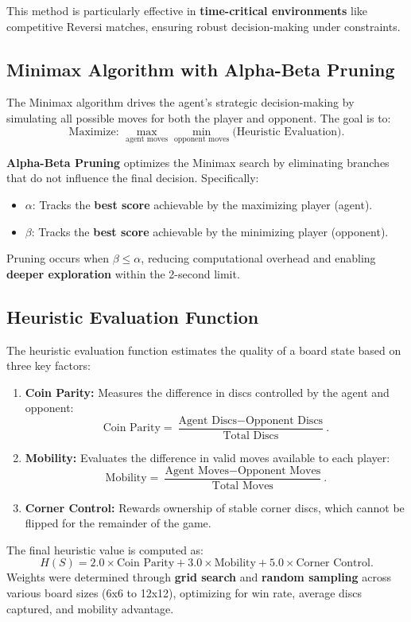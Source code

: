 \documentclass[11pt]{article}
\begin{document}
This method is particularly effective in \textbf{time-critical environments} like competitive Reversi matches, ensuring robust decision-making under constraints.

\subsection*{Minimax Algorithm with Alpha-Beta Pruning}
The Minimax algorithm drives the agent's strategic decision-making by simulating all possible moves for both the player and opponent. The goal is to:
\[
\text{Maximize: } \max_{\text{agent moves}} \min_{\text{opponent moves}} \text{(Heuristic Evaluation)}.
\]

\noindent \textbf{Alpha-Beta Pruning} optimizes the Minimax search by eliminating branches that do not influence the final decision. Specifically:
\begin{itemize}
    \item \(\alpha\): Tracks the \textbf{best score} achievable by the maximizing player (agent).
    \item \(\beta\): Tracks the \textbf{best score} achievable by the minimizing player (opponent).
\end{itemize}
Pruning occurs when \(\beta \leq \alpha\), reducing computational overhead and enabling \textbf{deeper exploration} within the 2-second limit.

\subsection*{Heuristic Evaluation Function}
The heuristic evaluation function estimates the quality of a board state based on three key factors:
\begin{enumerate}
    \item \textbf{Coin Parity:} Measures the difference in discs controlled by the agent and opponent:
    \[
    \text{Coin Parity} = \frac{\text{Agent Discs} - \text{Opponent Discs}}{\text{Total Discs}}.
    \]
    \item \textbf{Mobility:} Evaluates the difference in valid moves available to each player:
    \[
    \text{Mobility} = \frac{\text{Agent Moves} - \text{Opponent Moves}}{\text{Total Moves}}.
    \]
    \item \textbf{Corner Control:} Rewards ownership of stable corner discs, which cannot be flipped for the remainder of the game.
\end{enumerate}

\noindent The final heuristic value is computed as:
\[
H(S) = 2.0 \times \text{Coin Parity} + 3.0 \times \text{Mobility} + 5.0 \times \text{Corner Control}.
\]
Weights were determined through \textbf{grid search} and \textbf{random sampling} across various board sizes (6x6 to 12x12), optimizing for win rate, average discs captured, and mobility advantage.
\end{document}
